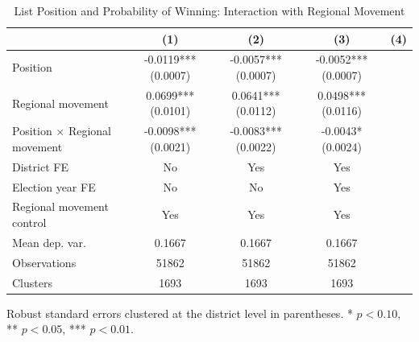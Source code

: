 \begin{table}[htbp]
\centering
\caption{List Position and Probability of Winning: Interaction with Regional Movement}
\label{tab:interaction_specs}
\begin{tabular}{lccc}
\toprule
 & (1) & (2) & (3) & (4) \\
\midrule
Position & -0.0119*** (0.0007) & -0.0057*** (0.0007) & -0.0052*** (0.0007) \\
Regional movement & 0.0699*** (0.0101) & 0.0641*** (0.0112) & 0.0498*** (0.0116) \\
Position $\times$ Regional movement & -0.0098*** (0.0021) & -0.0083*** (0.0022) & -0.0043* (0.0024) \\
\midrule
District FE & No & Yes & Yes \\
Election year FE & No & No & Yes \\
Regional movement control & Yes & Yes & Yes \\
Mean dep. var. & 0.1667 & 0.1667 & 0.1667 \\
Observations & 51862 & 51862 & 51862 \\
Clusters & 1693 & 1693 & 1693 \\
\bottomrule
\end{tabular}
\begin{flushleft}
\footnotesize Robust standard errors clustered at the district level in parentheses. * $p<0.10$, ** $p<0.05$, *** $p<0.01$.
\end{flushleft}
\end{table}